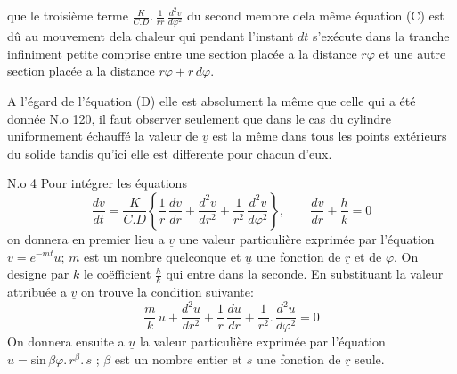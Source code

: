 \documentclass[11pt,a4paper]{article}
\begin{document}


que le troisième terme $\frac{K}{C.D}.\,\frac{1}{rr}\,\frac{d^{2}v}{d\varphi^{2}}$ 
du second membre dela même équation (C) est dû au
mouvement dela chaleur qui pendant l'instant $dt$
s'exécute dans la tranche infiniment petite comprise entre
une section placée a la distance $r\varphi$ et une autre section
placée a la distance $r\varphi + r\,d\varphi$.

A l'égard de l'équation (D) elle est absolument la même
que celle qui a été donnée N.o 120, il faut observer
seulement que dans le cas du cylindre uniformement
échauffé la valeur de $\underline{v}$ est la même dans tous les
points extérieurs du solide tandis qu'ici elle est differente
pour chacun d'eux.

N.o 4 Pour intégrer les équations
\[ \frac{dv}{dt} = \frac{K}{C.D}\left\{\frac{1}{r}\,\frac{dv}{dr} + \frac{d^{2}v}{dr^{2}} + \frac{1}{r^{2}}\,\frac{d^{2}v}{d\varphi^{2}}\right\},\qquad \frac{dv}{dr} + \frac{h}{k} = 0 \]
on donnera en premier lieu a $\underline{v}$ une valeur particulière
exprimée par l'équation $v = e^{-mt}u$; $m$ est un nombre
quelconque et $\underline{u}$ une fonction de $\underline{r}$ et de $\varphi$. 
On designe par $k$ le coëfficient  $\frac{h}{k}$ qui entre dans la seconde.
En substituant la valeur attribuée a $\underline{v}$ on trouve la condition
suivante:
\[ \frac{m}{k}\,u + \frac{d^{2}u}{dr^{2}} + \frac{1}{r}\,\frac{du}{dr} + \frac{1}{r^{2}}.\,\frac{d^{2}u}{d\varphi^{2}} = 0 \]
On donnera ensuite a $\underline{u}$ la valeur particulière exprimée
par l'équation \quad $u = \text{sin}\,\beta\varphi.\,r^{\beta}.\,s$ ; $\beta$ est un nombre
entier et $s$ une fonction de $\underline{r}$ seule.
\end{document}

